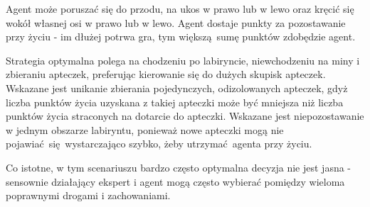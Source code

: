 Agent może poruszać się do przodu, na ukos w prawo lub w lewo oraz kręcić się wokół własnej osi w prawo lub w lewo. Agent dostaje punkty za pozostawanie przy życiu - im dłużej potrwa gra, tym większą sumę punktów zdobędzie agent.

Strategia optymalna polega na chodzeniu po labiryncie, niewchodzeniu na miny i zbieraniu apteczek, preferując kierowanie się do dużych skupisk apteczek. Wskazane jest unikanie zbierania pojedynczych, odizolowanych apteczek, gdyż liczba punktów życia uzyskana z takiej apteczki może być mniejsza niż liczba punktów życia straconych na dotarcie do apteczki. Wskazane jest niepozostawanie w jednym obszarze labiryntu, ponieważ nowe apteczki mogą nie pojawiać się wystarczająco szybko, żeby utrzymać agenta przy życiu.

Co istotne, w tym scenariuszu bardzo często optymalna decyzja nie jest jasna - sensownie działający ekspert i agent mogą często wybierać pomiędzy wieloma poprawnymi drogami i zachowaniami.

\begin{figure}[H]
	\begin{floatrow}
	\end{floatrow}
\end{figure}
